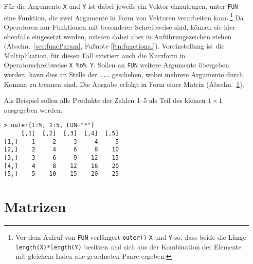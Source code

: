 Für die Argumente \lstinline!X! und \lstinline!Y! ist dabei jeweils ein Vektor einzutragen, unter \lstinline!FUN! eine Funktion, die zwei Argumente in Form von Vektoren verarbeiten kann.\footnote{Vor dem Aufruf von \lstinline!FUN! verlängert \lstinline!outer()! \lstinline!X! und \lstinline!Y! so, dass beide die Länge \lstinline!length(X)*length(Y)! besitzen und sich aus der Kombination der Elemente mit gleichem Index alle geordneten Paare ergeben.} Da Operatoren nur Funktionen mit besonderer Schreibweise sind, können sie hier ebenfalls eingesetzt werden, müssen dabei aber in Anführungszeichen stehen (Abschn.\ \ref{sec:funcParam}, Fußnote \ref{ftn:functional}). Voreinstellung ist die Multiplikation, für diesen Fall existiert auch die Kurzform in Operatorschreibweise \lstinline!X %o% Y!\@. Sollen an \lstinline!FUN! weitere Argumente übergeben werden, kann dies an Stelle der \lstinline!...! geschehen, wobei mehrere Argumente durch Komma zu trennen sind. Die Ausgabe erfolgt in Form einer Matrix (Abschn.\ \ref{sec:matrix}).

Als Beispiel sollen alle Produkte der Zahlen 1--5 als Teil des kleinen $1 \times 1$ ausgegeben werden.
\begin{lstlisting}
> outer(1:5, 1:5, FUN="*")
     [,1]  [,2]  [,3]  [,4]  [,5]
[1,]    1     2     3     4     5
[2,]    2     4     6     8    10
[3,]    3     6     9    12    15
[4,]    4     8    12    16    20
[5,]    5    10    15    20    25
\end{lstlisting}

\section{Matrizen}
\label{sec:matrix}

